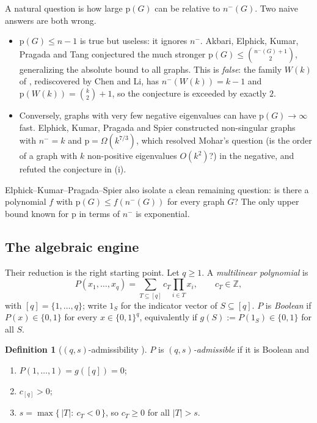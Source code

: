 \documentclass[11pt,a4paper]{article}
\theoremstyle{plain}
\theoremstyle{definition}
\newtheorem{definition}[theorem]{Definition}
\newcommand{\ZZ}{\mathbb{Z}}
\newcommand{\pp}{\mathrm{p}}
\begin{document}
A natural question is how large $\pp(G)$ can be relative to $n^-(G)$.  Two naive answers
are both wrong.
\begin{itemize}
\item[(i)] $\pp(G)\le n-1$ is true but useless: it ignores $n^-$.  Akbari, Elphick,
      Kumar, Pragada and Tang conjectured the much stronger
      $\pp(G)\le \binom{n^-(G)+1}{2}$, generalizing the absolute bound to all graphs.
      This is \emph{false}: the family $W(k)$ of \cite{CharlesEtAl2013},
      rediscovered by Chen and Li, has $n^-(W(k))=k-1$ and $\pp(W(k))=\binom{k}{2}+1$, so
      the conjecture is exceeded by exactly $2$.
\item[(ii)] Conversely, graphs with very few negative eigenvalues can have $\pp(G)\to\infty$
      fast.  Elphick, Kumar, Pragada and Spier constructed non-singular graphs with
      $n^-=k$ and $\pp=\Omega(k^{7/3})$, which resolved Mohar's question (is the order of a
      graph with $k$ non-positive eigenvalues $O(k^2)$?) in the negative, and refuted the
      conjecture in (i).
\end{itemize}
Elphick--Kumar--Pragada--Spier also isolate a clean remaining question: is there a
polynomial $f$ with $\pp(G)\le f(n^-(G))$ for every graph $G$?  The only upper bound known
for $\pp$ in terms of $n^-$ is exponential.

\subsection*{The algebraic engine}

Their reduction is the right starting point.  Let $q\ge 1$.  A \emph{multilinear
polynomial} is
\[
P(x_1,\dots,x_q)=\sum_{T\subseteq[q]} c_T\prod_{i\in T}x_i,\qquad c_T\in\ZZ ,
\]
with $[q]=\{1,\dots,q\}$; write $1_S$ for the indicator vector of $S\subseteq[q]$.  $P$
is \emph{Boolean} if $P(x)\in\{0,1\}$ for every $x\in\{0,1\}^q$, equivalently if
$g(S):=P(1_S)\in\{0,1\}$ for all $S$.

\begin{definition}[$(q,s)$-admissibility \cite{ElphickEtAl2026Inertia}]
\label{def:adm}
$P$ is \emph{$(q,s)$-admissible} if it is Boolean and
\begin{enumerate}
\item[(a)] $P(1,\dots,1)=g([q])=0$;
\item[(b)] $c_{[q]}>0$;
\item[(c)] $s=\max\{\,|T|:\ c_T<0\,\}$, so $c_T\ge 0$ for all $|T|>s$.
\end{enumerate}
\end{definition}
\end{document}
